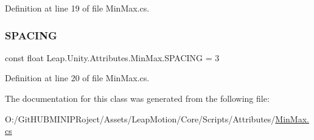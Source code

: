 Definition at line 19 of file Min\+Max.\+cs.

\mbox{\label{class_leap_1_1_unity_1_1_attributes_1_1_min_max_afc47897df4a1054f54fee1c5340050e5}} 
\subsubsection{\texorpdfstring{SPACING}{SPACING}}
{\footnotesize\ttfamily const float Leap.\+Unity.\+Attributes.\+Min\+Max.\+S\+P\+A\+C\+I\+NG = 3}



Definition at line 20 of file Min\+Max.\+cs.



The documentation for this class was generated from the following file\+:\begin{DoxyCompactItemize}
\item 
O\+:/\+Git\+H\+U\+B\+M\+I\+N\+I\+P\+Roject/\+Assets/\+Leap\+Motion/\+Core/\+Scripts/\+Attributes/\mbox{\hyperlink{_min_max_8cs}{Min\+Max.\+cs}}\end{DoxyCompactItemize}
